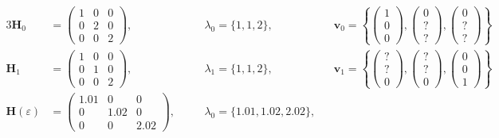 \begin{alignat}{3}
    \bm H_0 &=
    \begin{pmatrix}
        1 & 0 & 0\\
        0 & 2 & 0\\
        0 & 0 & 2
    \end{pmatrix},
    \quad
    && \lambda_0 = \{1, 1, 2\},
    \quad
    && \bm v_0 = \left\{
    \begin{pmatrix}
        1\\
        0\\
        0
    \end{pmatrix},
    \begin{pmatrix}
        0\\
        ?\\
        ?
    \end{pmatrix},
    \begin{pmatrix}
        0\\
        ?\\
        ?
    \end{pmatrix}
    \right\}
    \\
    \bm H_1 &=
    \begin{pmatrix}
        1 & 0 & 0\\
        0 & 1 & 0\\
        0 & 0 & 2
    \end{pmatrix},
    \quad
    && \lambda_1 = \{1, 1, 2\},
    \quad
    && \bm v_1 = \left\{
    \begin{pmatrix}
        ?\\
        ?\\
        0
    \end{pmatrix},
    \begin{pmatrix}
        ?\\
        ?\\
        0
    \end{pmatrix},
    \begin{pmatrix}
        0\\
        0\\
        1
    \end{pmatrix}
    \right\}
    \\
    \bm H(\varepsilon) &=
    \begin{pmatrix}
        1.01 & 0 & 0\\
        0 & 1.02 & 0\\
        0 & 0 & 2.02
    \end{pmatrix},
    \quad
    && \lambda_0 = \{1.01, 1.02, 2.02\},

\end{alignat}

